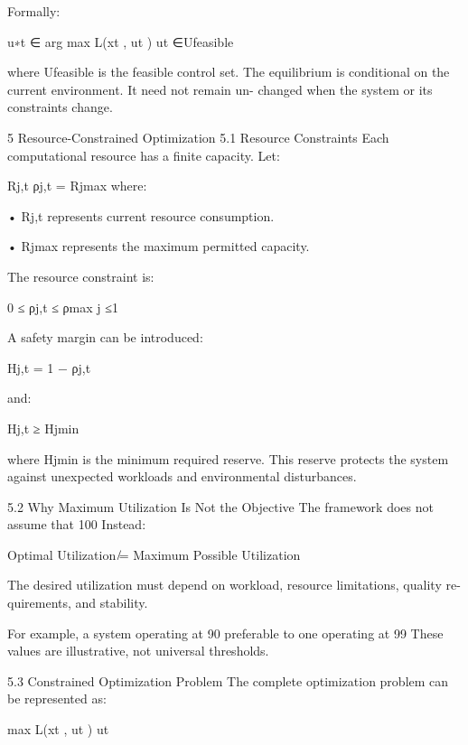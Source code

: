 \documentclass[10pt,a4paper]{article}
\begin{document}
\begin{ManuscriptText}
   Formally:

                                  u∗t ∈ arg max L(xt , ut )
                                          ut ∈Ufeasible


   where Ufeasible is the feasible control set.
   The equilibrium is conditional on the current environment. It need not remain un-
changed when the system or its constraints change.


5     Resource-Constrained Optimization
5.1     Resource Constraints
Each computational resource has a finite capacity.
   Let:

                                               Rj,t
                                      ρj,t =
                                               Rjmax
    where:

    • Rj,t represents current resource consumption.

    • Rjmax represents the maximum permitted capacity.

    The resource constraint is:

                                  0 ≤ ρj,t ≤ ρmax
                                              j   ≤1

    A safety margin can be introduced:

                                     Hj,t = 1 − ρj,t

    and:

                                      Hj,t ≥ Hjmin

    where Hjmin is the minimum required reserve.
    This reserve protects the system against unexpected workloads and environmental
disturbances.


5.2     Why Maximum Utilization Is Not the Objective
The framework does not assume that 100%
  Instead:

                  Optimal Utilization ̸= Maximum Possible Utilization

   The desired utilization must depend on workload, resource limitations, quality re-
quirements, and stability.


   For example, a system operating at 90%
preferable to one operating at 99%
   These values are illustrative, not universal thresholds.


5.3    Constrained Optimization Problem
The complete optimization problem can be represented as:

                                      max L(xt , ut )
                                       ut


\end{ManuscriptText}
\end{document}
